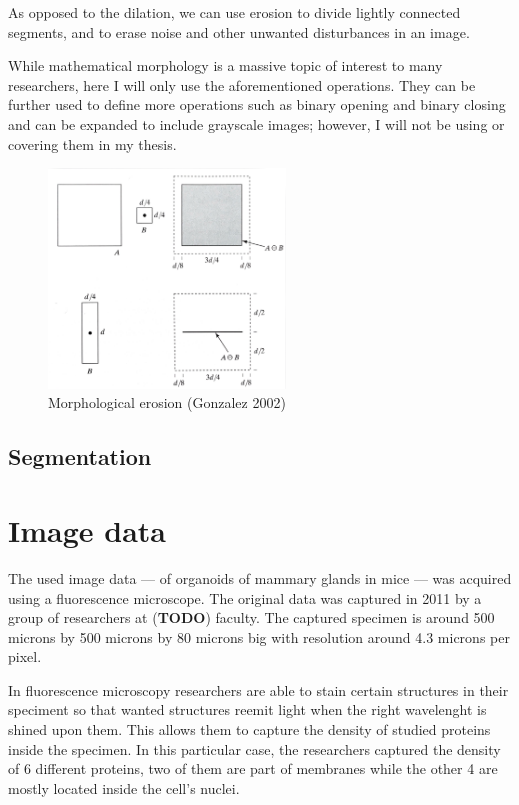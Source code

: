 \documentclass[
  digital,     %
  oneside,     %
  nosansbold,  %
  nocolorbold, %
  lof,         %
  lot,         %
]{fithesis4}
\begin{document}
As opposed to the dilation, we can use erosion to divide lightly connected
segments, and to erase noise and other unwanted disturbances in an image.

While mathematical morphology is a massive topic of interest to many
researchers, here I will only use the aforementioned operations. They can be
further used to define more operations such as binary opening and binary closing
and can be expanded to include grayscale images; however, I will not be using or covering
them in my thesis.

\begin{figure}
    \begin{center}
        \includegraphics[width=6.3cm]{resources/morph_erosion.jpg}
    \end{center}
    \caption{Morphological erosion (Gonzalez 2002)} %
    \label{fig:morph_erosion}
\end{figure}

\section{Segmentation}

\chapter{Image data}

The used image data --- of organoids of mammary glands in mice --- was acquired
using a fluorescence microscope. The original data was captured in 2011 by a
group of researchers at (\textbf{TODO}) faculty. The captured specimen is around
500 microns by 500 microns by 80 microns big with resolution around 4.3 microns
per pixel.

In fluorescence microscopy researchers are able to stain certain structures in
their speciment so that wanted structures reemit light when the right
wavelenght is shined upon them. This allows them to capture the density of
studied proteins inside the specimen. In this particular case, the researchers
captured the density of 6 different proteins, two of them are part of membranes
while the other 4 are mostly located inside the cell's nuclei.
\end{document}
